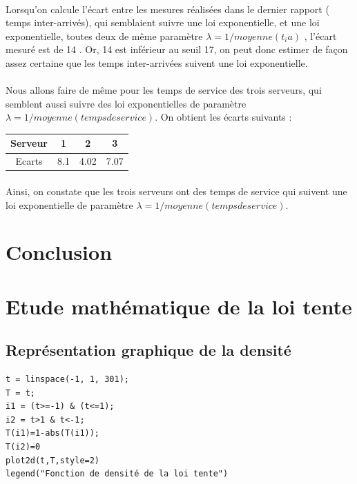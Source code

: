 \documentclass{article}
\begin{document}
\paragraph{}
Lorsqu’on calcule l’écart entre les mesures réalisées dans le dernier rapport ( temps inter-arrivés), qui semblaient suivre une loi exponentielle,  et une loi exponentielle, toutes deux de même paramètre $ \lambda = 1/moyenne(t_ia)$ , l’écart mesuré est de 14 . Or, 14 est inférieur au seuil 17, on peut donc estimer de façon assez certaine que les temps inter-arrivées suivent une loi exponentielle.

\paragraph{}
Nous allons faire de même pour les temps de service des trois serveurs, qui semblent aussi suivre des loi exponentielles de paramètre $\lambda = 1/moyenne(temps de service)$. On obtient les écarts suivants :
\begin{center}
\begin{tabular}{cccc}
Serveur & 1 & 2 & 3 \\
\hline
Ecarts & 8.1 & 4.02 & 7.07 \\
\hline
\end{tabular}
\end{center}
\paragraph{}
Ainsi, on constate que les trois serveurs ont des temps de service qui suivent une loi exponentielle de paramètre $\lambda= 1/moyenne(temps de service)$.
\section{Conclusion}
\paragraph{}

\newpage
\appendix

\section{Etude mathématique de la loi tente}
\subsection{Représentation graphique de la densité}
\begin{verbatim}
t = linspace(-1, 1, 301);
T = t;
i1 = (t>=-1) & (t<=1);
i2 = t>1 & t<-1;
T(i1)=1-abs(T(i1));
T(i2)=0
plot2d(t,T,style=2)
legend("Fonction de densité de la loi tente")
\end{verbatim}
\end{document}
